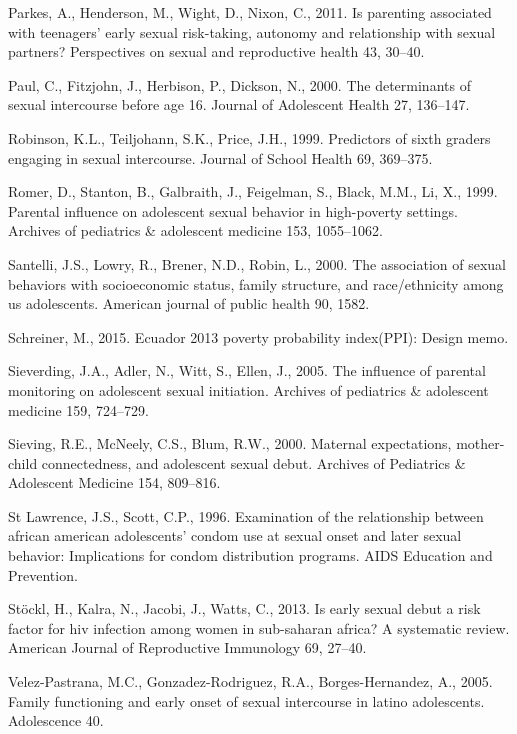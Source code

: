 \documentclass[
]{article}
\newlength{\cslhangindent}
\newenvironment{cslreferences}%
  {\setlength{\parindent}{0pt}%
  \everypar{\setlength{\hangindent}{\cslhangindent}}\ignorespaces}%
  {\par}
\begin{document}
\begin{cslreferences}
\leavevmode\hypertarget{ref-parkes2011parenting}{}%
Parkes, A., Henderson, M., Wight, D., Nixon, C., 2011. Is parenting
associated with teenagers' early sexual risk-taking, autonomy and
relationship with sexual partners? Perspectives on sexual and
reproductive health 43, 30--40.

\leavevmode\hypertarget{ref-paul2000determinants}{}%
Paul, C., Fitzjohn, J., Herbison, P., Dickson, N., 2000. The
determinants of sexual intercourse before age 16. Journal of Adolescent
Health 27, 136--147.

\leavevmode\hypertarget{ref-robinson1999predictors}{}%
Robinson, K.L., Teiljohann, S.K., Price, J.H., 1999. Predictors of sixth
graders engaging in sexual intercourse. Journal of School Health 69,
369--375.

\leavevmode\hypertarget{ref-romer1999parental}{}%
Romer, D., Stanton, B., Galbraith, J., Feigelman, S., Black, M.M., Li,
X., 1999. Parental influence on adolescent sexual behavior in
high-poverty settings. Archives of pediatrics \& adolescent medicine
153, 1055--1062.

\leavevmode\hypertarget{ref-santelli2000association}{}%
Santelli, J.S., Lowry, R., Brener, N.D., Robin, L., 2000. The
association of sexual behaviors with socioeconomic status, family
structure, and race/ethnicity among us adolescents. American journal of
public health 90, 1582.

\leavevmode\hypertarget{ref-schreiner2015ecuador}{}%
Schreiner, M., 2015. Ecuador 2013 poverty probability index(PPI): Design
memo.

\leavevmode\hypertarget{ref-sieverding2005influence}{}%
Sieverding, J.A., Adler, N., Witt, S., Ellen, J., 2005. The influence of
parental monitoring on adolescent sexual initiation. Archives of
pediatrics \& adolescent medicine 159, 724--729.

\leavevmode\hypertarget{ref-sieving2000maternal}{}%
Sieving, R.E., McNeely, C.S., Blum, R.W., 2000. Maternal expectations,
mother-child connectedness, and adolescent sexual debut. Archives of
Pediatrics \& Adolescent Medicine 154, 809--816.

\leavevmode\hypertarget{ref-st1996examination}{}%
St Lawrence, J.S., Scott, C.P., 1996. Examination of the relationship
between african american adolescents' condom use at sexual onset and
later sexual behavior: Implications for condom distribution programs.
AIDS Education and Prevention.

\leavevmode\hypertarget{ref-stockl2013early}{}%
Stöckl, H., Kalra, N., Jacobi, J., Watts, C., 2013. Is early sexual
debut a risk factor for hiv infection among women in sub-saharan africa?
A systematic review. American Journal of Reproductive Immunology 69,
27--40.

\leavevmode\hypertarget{ref-velez2005family}{}%
Velez-Pastrana, M.C., Gonzadez-Rodriguez, R.A., Borges-Hernandez, A.,
2005. Family functioning and early onset of sexual intercourse in latino
adolescents. Adolescence 40.
\end{cslreferences}
\end{document}
